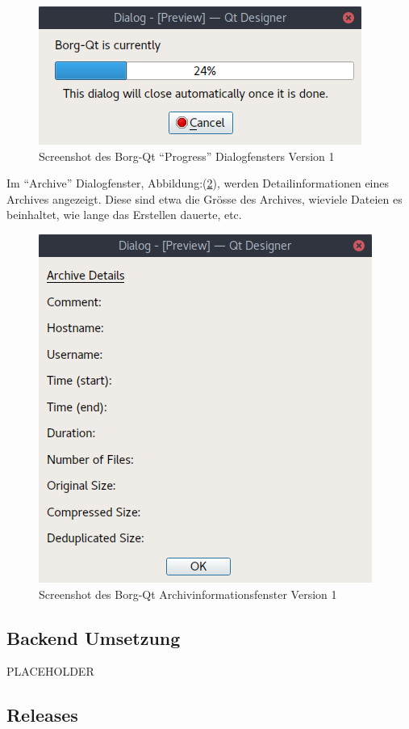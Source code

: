 \begin{figure}[H]
\centering
\includegraphics[width=.6\textwidth]{pictures/borgqt_progress_v1.png}
\caption{\label{fig:orgcb30462}
Screenshot des Borg-Qt "`Progress"' Dialogfensters Version 1}
\end{figure}

Im "`Archive"' Dialogfenster, Abbildung:(\ref{fig:org7511fd2}), werden
Detailinformationen eines Archives angezeigt. Diese sind etwa die Grösse des
Archives, wieviele Dateien es beinhaltet, wie lange das Erstellen dauerte, etc.

\begin{figure}[H]
\centering
\includegraphics[width=.6\textwidth]{pictures/borgqt_archive_v1.png}
\caption{\label{fig:org7511fd2}
Screenshot des Borg-Qt Archivinformationsfenster Version 1}
\end{figure}

\subsection{Backend Umsetzung}
\label{sec:org61c609d}

PLACEHOLDER

\subsection{Releases}
\label{sec:org8ba8c5e}

